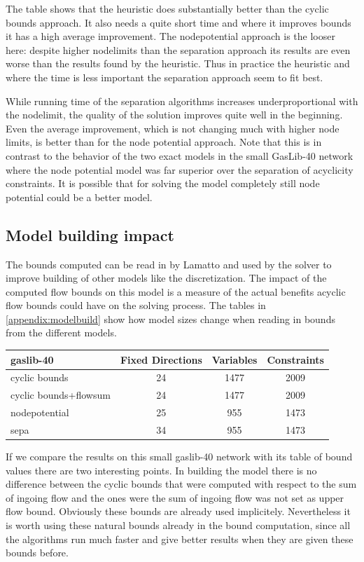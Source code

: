 The table shows that the heuristic does substantially better than the cyclic bounds approach. It also needs a quite 
short time and where it improves bounds it has a high average improvement. The nodepotential approach is the looser 
here: despite higher nodelimits than the separation approach its results are even worse than the results found 
by the heuristic. Thus in practice the heuristic and where the time is less important the separation approach seem to 
fit best. 

While running time of the separation algorithms increases underproportional with the nodelimit, the quality of the 
solution improves quite well in the beginning. Even the average improvement, which is not changing much with higher 
node limits, is better than for the node potential approach. Note that this is in contrast to the behavior of 
the two exact models in the small GasLib-40 network where the node potential model was far superior over the separation 
of acyclicity constraints. It is possible that for solving the model completely still node potential could be a better 
model.


\subsection{Model building impact}
The bounds computed can be read in by Lamatto and used by the solver to improve building of other models like the 
discretization. The impact of the computed flow bounds on this model is a measure of the actual benefits acyclic 
flow bounds could have on the solving process. The tables in \ref{appendix:modelbuild} show how model sizes change when 
reading in bounds from the different models.


\begin{center}
\begin{tabular}{ l | c | c | c }
\textbf{gaslib-40} & Fixed Directions & Variables&Constraints\\
\hline
 cyclic bounds&24 &1477&2009 \\
 cyclic bounds+flowsum &24 & 1477 &2009 \\
 nodepotential& 25 &955 &1473  \\ 
 sepa& 34 &955 &1473 \\
\end{tabular} 
\end{center}
If we compare the results on this small gaslib-40 network with its table of bound values there are two interesting 
points. In building the model there is no difference between the cyclic bounds that were computed with respect to the 
sum of ingoing flow and the ones were the sum of ingoing flow was not set as upper flow bound. Obviously these bounds 
are already used implicitely. Nevertheless it is worth using these natural bounds already in the bound computation, 
since all the algorithms run much faster and give better results when they are given these bounds before. 

